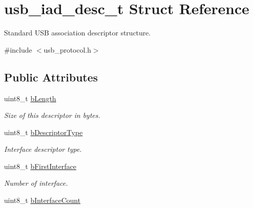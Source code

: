 \hypertarget{structusb__iad__desc__t}{\section{usb\-\_\-iad\-\_\-desc\-\_\-t Struct Reference}
\label{structusb__iad__desc__t}
}


Standard U\-S\-B association descriptor structure.  




{\ttfamily \#include $<$usb\-\_\-protocol.\-h$>$}

\subsection*{Public Attributes}
\begin{DoxyCompactItemize}
\item 
\hypertarget{structusb__iad__desc__t_a13a3d5b27f54c67d2115e48902ce68c7}{uint8\-\_\-t \hyperlink{structusb__iad__desc__t_a13a3d5b27f54c67d2115e48902ce68c7}{b\-Length}}\label{structusb__iad__desc__t_a13a3d5b27f54c67d2115e48902ce68c7}

\begin{DoxyCompactList}\small\item\em Size of this descriptor in bytes. \end{DoxyCompactList}\item 
\hypertarget{structusb__iad__desc__t_aad5b760da92290217db3463a7342a7b4}{uint8\-\_\-t \hyperlink{structusb__iad__desc__t_aad5b760da92290217db3463a7342a7b4}{b\-Descriptor\-Type}}\label{structusb__iad__desc__t_aad5b760da92290217db3463a7342a7b4}

\begin{DoxyCompactList}\small\item\em Interface descriptor type. \end{DoxyCompactList}\item 
\hypertarget{structusb__iad__desc__t_a0d32a4f394cd5bc64295725434eeccfd}{uint8\-\_\-t \hyperlink{structusb__iad__desc__t_a0d32a4f394cd5bc64295725434eeccfd}{b\-First\-Interface}}\label{structusb__iad__desc__t_a0d32a4f394cd5bc64295725434eeccfd}

\begin{DoxyCompactList}\small\item\em Number of interface. \end{DoxyCompactList}\item 
\hypertarget{structusb__iad__desc__t_a405850b6548dd1b924e386e3bd8569eb}{uint8\-\_\-t \hyperlink{structusb__iad__desc__t_a405850b6548dd1b924e386e3bd8569eb}{b\-Interface\-Count}}\label{structusb__iad__desc__t_a405850b6548dd1b924e386e3bd8569eb}


\end{DoxyCompactItemize}
